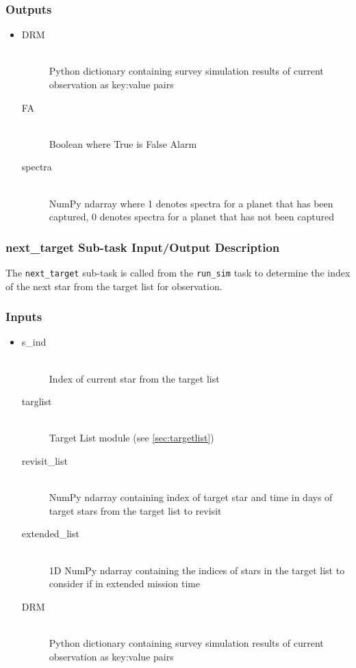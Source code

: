 \documentclass[cleanfoot]{asme2ej}
\begin{document}
\subsubsection*{Outputs}
\begin{itemize}
    \item 
    \begin{description}
        \item[DRM] \hfill \\
        Python dictionary containing survey simulation results of current observation as key:value pairs
        \item[FA] \hfill \\
        Boolean where True is False Alarm
        \item[spectra] \hfill \\
        NumPy ndarray where 1 denotes spectra for a planet that has been captured, 0 denotes spectra for a planet that has not been captured
    \end{description}
\end{itemize}

\subsubsection{next\_target Sub-task Input/Output Description} \label{sec:nexttargettask}
The \verb+next_target+ sub-task is called from the \verb+run_sim+ task to determine the index of the next star from the target list for observation.

\subsubsection*{Inputs}
\begin{itemize}
    \item 
    \begin{description}
        \item[s\_ind] \hfill \\
        Index of current star from the target list
        \item[targlist] \hfill \\
        Target List module (see \ref{sec:targetlist})
        \item[revisit\_list] \hfill \\
        NumPy ndarray containing index of target star and time in days of target stars from the target list to revisit
        \item[extended\_list] \hfill \\
        1D NumPy ndarray containing the indices of stars in the target list to consider if in extended mission time
        \item[DRM] \hfill \\
        Python dictionary containing survey simulation results of current observation as key:value pairs
    \end{description}
\end{itemize}
\end{document}
